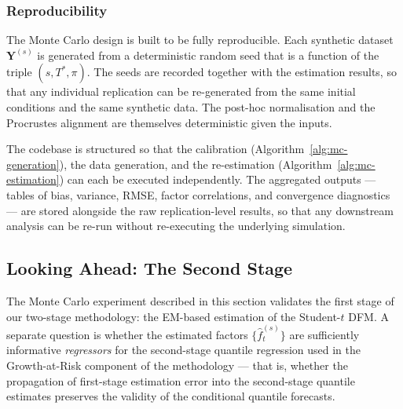 \documentclass[11pt, a4paper, oneside]{article}
\newcommand{\mY}{\mathbf{Y}}
\begin{document}
\subsubsection{Reproducibility}

The Monte Carlo design is built to be fully reproducible. Each
synthetic dataset $\mY^{(s)}$ is generated from a deterministic
random seed that is a function of the triple $(s, T^*, \pi)$. The
seeds are recorded together with the estimation results, so that
any individual replication can be re-generated from the same
initial conditions and the same synthetic data. The post-hoc
normalisation and the Procrustes alignment are themselves
deterministic given the inputs.

The codebase is structured so that the calibration
(Algorithm~\ref{alg:mc-generation}), the data generation, and the
re-estimation (Algorithm~\ref{alg:mc-estimation}) can each be
executed independently. The aggregated outputs — tables of bias,
variance, RMSE, factor correlations, and convergence diagnostics —
are stored alongside the raw replication-level results, so that any
downstream analysis can be re-run without re-executing the
underlying simulation.

\subsection{Looking Ahead: The Second Stage}
\label{subsec:mc-looking-ahead}

The Monte Carlo experiment described in this section validates the
first stage of our two-stage methodology: the EM-based estimation
of the Student-$t$ DFM. A separate question is whether the estimated
factors $\{\hat{f}_t^{(s)}\}$ are sufficiently informative
\emph{regressors} for the second-stage quantile regression used in
the Growth-at-Risk component of the methodology — that is, whether
the propagation of first-stage estimation error into the
second-stage quantile estimates preserves the validity of the
conditional quantile forecasts.
\end{document}
